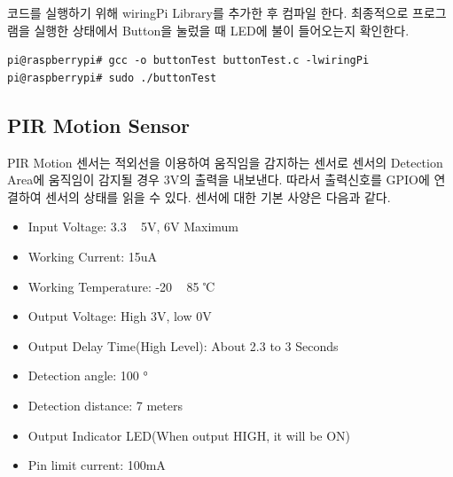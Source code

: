 \documentclass[11pt
  , a4paper
  , article
  , oneside
]{memoir}
\begin{document}
코드를 실행하기 위해 wiringPi Library를 추가한 후 컴파일 한다. 최종적으로 프로그램을 실행한 상태에서
Button을 눌렀을 때 LED에 불이 들어오는지 확인한다.
\begin{lstlisting}[style=termstyle]
pi@raspberrypi# gcc -o buttonTest buttonTest.c -lwiringPi
pi@raspberrypi# sudo ./buttonTest
\end{lstlisting}
\subsection{PIR Motion Sensor}
PIR Motion 센서는 적외선을 이용하여 움직임을 감지하는 센서로 센서의 Detection Area에 움직임이 감지될
경우 3V의 출력을 내보낸다. 따라서 출력신호를 GPIO에 연결하여 센서의 상태를 읽을 수 있다. 센서에 대한 
기본 사양은 다음과 같다.
\begin{itemize}
\item Input Voltage: 3.3 ~ 5V, 6V Maximum
\item Working Current: 15uA
\item Working Temperature: -20 ~ 85 ℃
\item Output Voltage: High 3V, low 0V
\item Output Delay Time(High Level): About 2.3 to 3 Seconds
\item Detection angle: 100 °
\item Detection distance: 7 meters
\item Output Indicator LED(When output HIGH, it will be ON)
\item Pin limit current: 100mA
\end{itemize}
\end{document}
